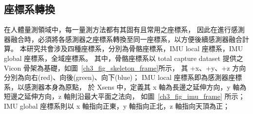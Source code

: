 \subsection{座標系轉換}
在人體量測領域中，每一量測方法都有其固有且常用之座標系，
因此在進行感測器融合時，必須將各感測器之座標系轉換至同一座標系，以方便後續感測器融合計算。
本研究共會涉及四種座標系，分別為骨骼座標系，IMU local 座標系，IMU global 座標系，全域座標系。
其中，骨骼座標系以 total capture dataset 提供之 Vicon 骨架為基礎，如圖~\ref{ch3_fig_skeleton_frame}所示，
其 +x、+y、+z 方向分別為向右(red)、向後(green)、向下(blue)；
IMU local 座標系即為感測器座標系，以感測器本身為原點，
於 Xsens 中，定義其 x 軸為長邊之延伸方向，y 軸為短邊之延伸方向，z 軸則沿最大平面之法向，
如圖~\ref{ch3_fig_imu_frame} 所示；
IMU global 座標系則以 x 軸指向正東，y 軸指向正北，z 軸指向天頂為正；
